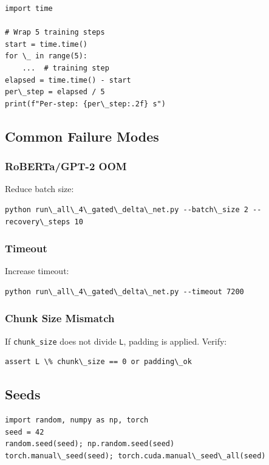 \begin{lstlisting}
import time

# Wrap 5 training steps
start = time.time()
for \_ in range(5):
    ...  # training step
elapsed = time.time() - start
per\_step = elapsed / 5
print(f"Per-step: {per\_step:.2f} s")
\end{lstlisting}

\subsection{Common Failure Modes}

\subsubsection{RoBERTa/GPT-2 OOM}

Reduce batch size:

\begin{lstlisting}
python run\_all\_4\_gated\_delta\_net.py --batch\_size 2 --recovery\_steps 10
\end{lstlisting}

\subsubsection{Timeout}

Increase timeout:

\begin{lstlisting}
python run\_all\_4\_gated\_delta\_net.py --timeout 7200
\end{lstlisting}

\subsubsection{Chunk Size Mismatch}

If \texttt{chunk\_size} does not divide \texttt{L}, padding is applied. Verify:

\begin{lstlisting}
assert L \% chunk\_size == 0 or padding\_ok
\end{lstlisting}

\subsection{Seeds}

\begin{lstlisting}
import random, numpy as np, torch
seed = 42
random.seed(seed); np.random.seed(seed)
torch.manual\_seed(seed); torch.cuda.manual\_seed\_all(seed)
\end{lstlisting}

